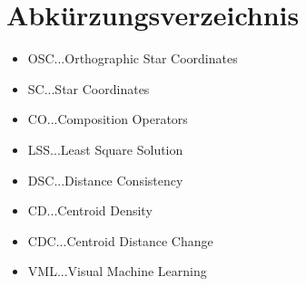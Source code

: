 \chapter{Abkürzungsverzeichnis}
%
\begin{itemize}
    \item
        OSC...Orthographic Star Coordinates
    \item 
        SC...Star Coordinates
    \item 
        CO...Composition Operators
    \item
    	LSS...Least Square Solution
    \item 
        DSC...Distance Consistency
    \item  
        CD...Centroid Density
    \item
        CDC...Centroid Distance Change
    \item
        VML...Visual Machine Learning
\end{itemize}






